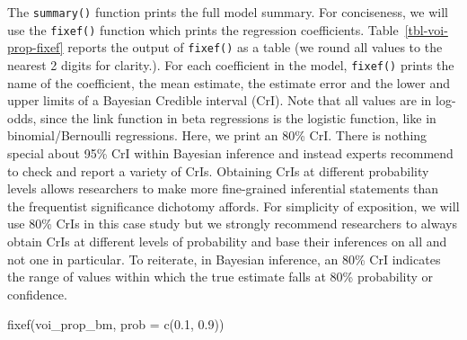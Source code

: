 \documentclass[
  authoryear,
  preprint,
  3p]{elsarticle}
\newenvironment{Shaded}{\begin{snugshade}}{\end{snugshade}}
\newcommand{\AttributeTok}[1]{\textcolor[rgb]{0.40,0.45,0.13}{#1}}
\newcommand{\FloatTok}[1]{\textcolor[rgb]{0.68,0.00,0.00}{#1}}
\newcommand{\FunctionTok}[1]{\textcolor[rgb]{0.28,0.35,0.67}{#1}}
\newcommand{\NormalTok}[1]{\textcolor[rgb]{0.00,0.23,0.31}{#1}}
\begin{document}
The \texttt{summary()} function prints the full model summary. For
conciseness, we will use the \texttt{fixef()} function which prints the
regression coefficients. Table~\ref{tbl-voi-prop-fixef} reports the
output of \texttt{fixef()} as a table (we round all values to the
nearest 2 digits for clarity.). For each coefficient in the model,
\texttt{fixef()} prints the name of the coefficient, the mean estimate,
the estimate error and the lower and upper limits of a Bayesian Credible
interval (CrI). Note that all values are in log-odds, since the link
function in beta regressions is the logistic function, like in
binomial/Bernoulli regressions. Here, we print an 80\% CrI. There is
nothing special about 95\% CrI within Bayesian inference and instead
experts recommend to check and report a variety of CrIs. Obtaining CrIs
at different probability levels allows researchers to make more
fine-grained inferential statements than the frequentist significance
dichotomy affords. For simplicity of exposition, we will use 80\% CrIs
in this case study but we strongly recommend researchers to always
obtain CrIs at different levels of probability and base their inferences
on all and not one in particular. To reiterate, in Bayesian inference,
an 80\% CrI indicates the range of values within which the true estimate
falls at 80\% probability or confidence.

\begin{Shaded}
\begin{Highlighting}[]
\FunctionTok{fixef}\NormalTok{(voi\_prop\_bm, }\AttributeTok{prob =} \FunctionTok{c}\NormalTok{(}\FloatTok{0.1}\NormalTok{, }\FloatTok{0.9}\NormalTok{))}
\end{Highlighting}
\end{Shaded}
\end{document}
